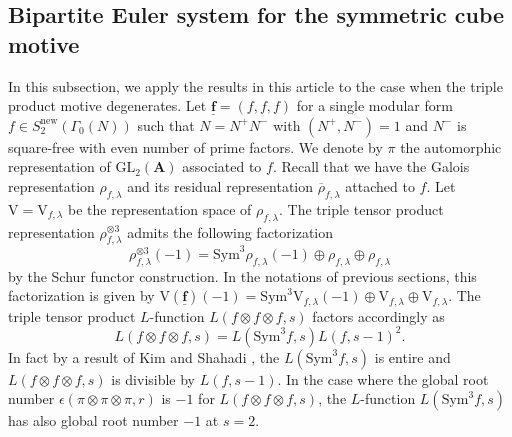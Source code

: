 \documentclass[10pt]{amsart}
\numberwithin{equation}{section}
\theoremstyle{plain}
\numberwithin{equation}{section}
\theoremstyle{definition}
\theoremstyle{remark}
\def\GL{\mathrm{GL}}
\def\triplef{\underline{\mathbf{f}}}
\def\rmV{\mathrm{V}}
\begin{document}
\subsection{Bipartite Euler system for the symmetric cube motive} In this subsection, we apply the results in this article to the case when the triple product motive degenerates. Let $\triplef=(f, f, f)$ for a single modular form $f\in S^{\mathrm{new}}_{2}(\Gamma_{0}(N))$ such that $N=N^{+}N^{-}$ with $(N^{+}, N^{-})=1$ and $N^{-}$ is square-free with even number of prime factors. We denote by $\pi$ the automorphic representation of $\GL_{2}(\mathbf{A})$ associated to $f$. Recall that we have the Galois representation $\rho_{f, \lambda}$ and its residual representation $\overline{\rho}_{f, \lambda}$ attached to $f$. Let $\rmV=\rmV_{f,\lambda}$ be the representation space of $\rho_{f, \lambda}$. The triple tensor product representation $\rho^{\otimes 3}_{f, \lambda}$ admits the following factorization
\begin{equation*}
\rho^{\otimes3}_{f, \lambda}(-1)=\mathrm{Sym}^{3}\rho_{f, \lambda}(-1)\oplus \rho_{f, \lambda}\oplus \rho_{f, \lambda}
\end{equation*}
by the Schur functor construction. In the notations of previous sections, this factorization is given by $\rmV({\triplef})(-1)=\mathrm{Sym}^{3}\rmV_{f, \lambda}(-1)\oplus \rmV_{f, \lambda}\oplus \rmV_{f, \lambda}$. The triple tensor product $L$-function $L(f\otimes f\otimes f, s)$ factors accordingly as 
\begin{equation*}
L(f\otimes f\otimes f, s)=L(\mathrm{Sym}^{3}f, s)L(f, s-1)^{2}.
\end{equation*}
In fact by a result of Kim and Shahadi \cite{KS}, the $L(\mathrm{Sym}^{3}f, s)$ is entire and  $L(f\otimes f\otimes f, s)$ is divisible by $L(f, s-1)$. In the case where the global root number $\epsilon(\pi\otimes\pi\otimes \pi, r)$ is $-1$ for $L(f\otimes f\otimes f, s)$, the $L$-function $L(\mathrm{Sym}^{3}f, s)$ has also global root number $-1$ at $s=2$. 
\end{document}
